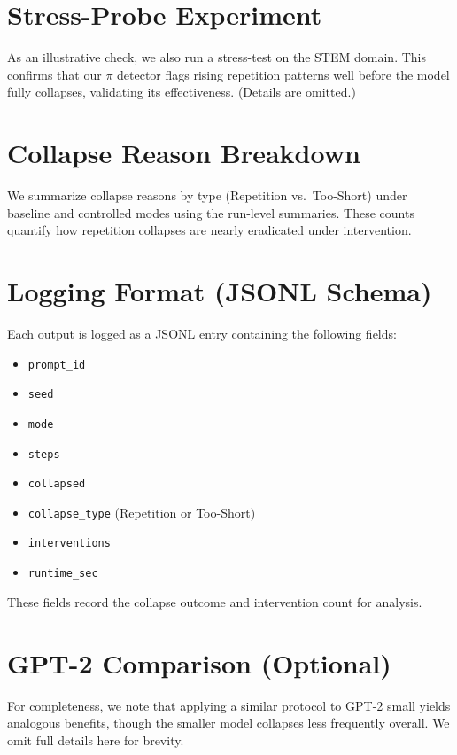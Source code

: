 \documentclass{article}
\begin{document}
\appendix

\section{Stress-Probe Experiment}
As an illustrative check, we also run a stress-test on the STEM domain. This confirms that our $\pi$ detector flags rising repetition patterns well before the model fully collapses, validating its effectiveness. (Details are omitted.)

\section{Collapse Reason Breakdown}
\label{app:reasons}
We summarize collapse reasons by type (Repetition vs.\ Too-Short) under baseline and controlled modes using the run-level summaries. These counts quantify how repetition collapses are nearly eradicated under intervention.

\section{Logging Format (JSONL Schema)}
Each output is logged as a JSONL entry containing the following fields:
\begin{itemize}
  \item \texttt{prompt\_id}
  \item \texttt{seed}
  \item \texttt{mode}
  \item \texttt{steps}
  \item \texttt{collapsed}
  \item \texttt{collapse\_type} (Repetition or Too-Short)
  \item \texttt{interventions}
  \item \texttt{runtime\_sec}
\end{itemize}
These fields record the collapse outcome and intervention count for analysis.

\section{GPT-2 Comparison (Optional)}
For completeness, we note that applying a similar protocol to GPT-2 small yields analogous benefits, though the smaller model collapses less frequently overall. We omit full details here for brevity.
\end{document}
